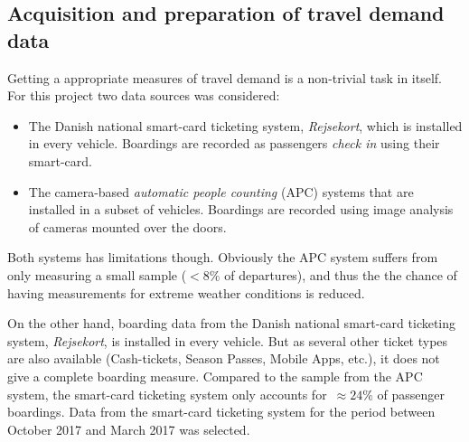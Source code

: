 
\subsection{Acquisition and preparation of travel demand data}
\label{appx:travel_demand_data_prep}

Getting a appropriate measures of travel demand is a non-trivial task in itself. For this project two data sources was considered:
\begin{itemize}
    \item The Danish national smart-card ticketing system, \emph{Rejsekort}, which is installed in every vehicle. Boardings are recorded as passengers \emph{check in} using their smart-card.
    \item The camera-based \emph{automatic people counting} (APC) systems that are installed in a subset of vehicles. Boardings are recorded using image analysis of cameras mounted over the doors.
\end{itemize}

Both systems has limitations though. Obviously the APC system suffers from only measuring a small sample ($<8\%$ of departures), and thus the the chance of having measurements for extreme weather conditions is reduced.

On the other hand, boarding data from the Danish national smart-card ticketing system, \emph{Rejsekort}, is installed in every vehicle. But as several other ticket types are also available (Cash-tickets, Season Passes, Mobile Apps, etc.), it does not give a complete boarding measure. Compared to the sample from the APC system, the smart-card ticketing system only accounts for~$\approx 24\%$ of passenger boardings.
Data from the smart-card ticketing system for the period between October 2017 and March 2017 was selected.